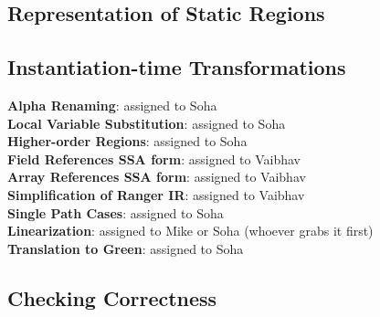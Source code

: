 %

\subsection{Representation of Static Regions}

\subsection{Instantiation-time Transformations}
\textbf{Alpha Renaming}: assigned to Soha\\
\textbf{Local Variable Substitution}: assigned to Soha\\
\textbf{Higher-order Regions}: assigned to Soha\\
\textbf{Field References SSA form}: assigned to Vaibhav\\
\textbf{Array References SSA form}: assigned to Vaibhav\\
\textbf{Simplification of Ranger IR}: assigned to Vaibhav\\
\textbf{Single Path Cases}: assigned to Soha\\
\textbf{Linearization}: assigned to Mike or Soha (whoever grabs it first)\\
\textbf{Translation to Green}: assigned to Soha\\

\subsection{Checking Correctness}

